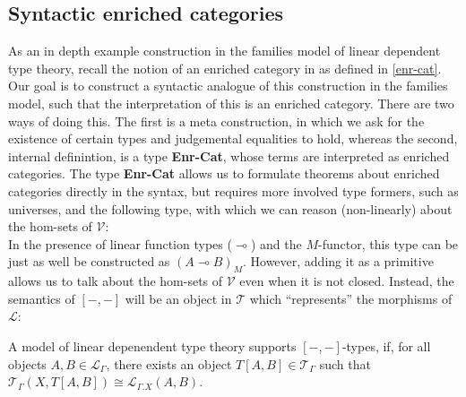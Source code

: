 \subsection{Syntactic enriched categories}
As an in depth example construction in the families model of linear dependent type theory, recall the notion of an enriched category in as defined in \ref{enr-cat}.
Our goal is to construct a syntactic analogue of this construction in the families model, such that the interpretation of this is an enriched category. There are two ways of doing this. The first is a meta construction, in which we ask for the existence of certain types and judgemental equalities to hold, whereas the second, internal definintion, is a type \textbf{Enr-Cat}, whose terms are interpreted as enriched categories. The type \textbf{Enr-Cat} allows us to formulate theorems about enriched categories directly in the syntax, but requires more involved type formers, such as universes, and the following type,
with which we can reason (non-linearly) about the hom-sets of $\mathcal{V}$:\\
In the presence of linear function types ($\multimap$) and the $M$-functor, this type can be just as well be constructed as $(A \multimap B)_M$. However, adding it as a primitive allows us to talk about the hom-sets of $\mathcal{V}$ even when it is not closed. Instead, the semantics of $[-, -]$ will be an object in $\mathcal{T}$ which ``represents'' the morphisms of $\mathcal{L}$:
\begin{defn}
  A model of linear depenendent type theory supports $[-,-]$-types, if, for all objects $A, B \in \mathcal{L}_{\Gamma}$, there exists an object $T[A, B] \in \mathcal{T}_{\Gamma}$ such that $\mathcal{T}_{\Gamma}(X, T[A, B]) \cong \mathcal{L}_{\Gamma.X}(A, B)$.
\end{defn}

